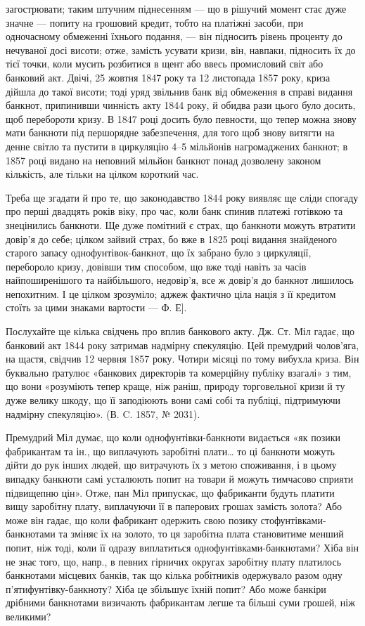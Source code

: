 \parcont{}  %
загострювати; таким штучним піднесенням — що в рішучий момент стає дуже
значне — попиту на грошовий кредит, тобто на платіжні засоби, при одночасному
обмеженні їхнього подання, — він підносить рівень проценту до нечуваної досі
висоти; отже, замість усувати кризи, він, навпаки, підносить їх до тієї точки,
коли мусить розбитися в щент або ввесь промисловий світ або банковий акт.
Двічі, 25 жовтня 1847 року та 12 листопада 1857 року, криза дійшла до такої
висоти; тоді уряд звільнив банк від обмеження в справі видання банкнот, припинивши
чинність акту 1844 року, й обидва рази цього було досить, щоб перебороти
кризу. В 1847 році досить було певности, що тепер можна знову мати
банкноти під першорядне забезпечення, для того щоб знову витягти на денне
світло та пустити в циркуляцію 4--5 мільйонів нагромаджених банкнот; в
1857 році видано на неповний мільйон банкнот понад дозволену законом кількість,
але тільки на цілком короткий час.

Треба ще згадати й про те, що законодавство 1844 року виявляє ще сліди
спогаду про перші двадцять років віку, про час, коли банк спинив платежі готівкою
та знецінились банкноти. Ще дуже помітний є страх, що банкноти можуть
втратити довір’я до себе; цілком зайвий страх, бо вже в 1825 році видання
знайденого старого запасу однофунтівок-банкнот, що їх забрано було з
циркуляції, перебороло кризу, довівши тим способом, що вже тоді навіть за часів
найпоширенішого та найбільшого, недовір’я, все ж довір’я до банкнот лишилось
непохитним. І це цілком зрозуміло; аджеж фактично ціла нація з її кредитом
стоїть за цими знаками вартости — Ф. Е].

Послухайте ще кілька свідчень про вплив банкового акту. Дж. Ст. Міл
гадає, що банковий акт 1844 року затримав надмірну спекуляцію. Цей премудрий
чолов’яга, на щастя, свідчив 12 червня 1857 року. Чотири місяці по тому
вибухла криза. Він буквально ґратулює «банкових директорів та комерційну
публіку взагалі» з тим, що вони «розуміють тепер краще, ніж раніш, природу
торговельної кризи й ту дуже велику шкоду, що її заподіюють вони самі собі
та публіці, підтримуючи надмірну спекуляцію». (В. C. 1857, № 2031).

Премудрий Міл думає, що коли однофунтівки-банкноти видається «як позики
фабрикантам та ін., що виплачують заробітні плати\dots{} то ці банкноти
можуть дійти до рук інших людей, що витрачують їх з метою споживання, і в
цьому випадку банкноти самі усталюють попит на товари й можуть тимчасово
сприяти підвищепню цін». Отже, пан Міл припускає, що фабриканти будуть
платити вищу заробітну плату, виплачуючи її в паперових грошах замість золота?
Або може він гадає, що коли фабрикант одержить свою позику стофунтівками-банкнотами
та зміняє їх на золото, то ця заробітна плата становитиме менший
попит, ніж тоді, коли її одразу виплатиться однофунтівками-банкнотами? Хіба
він не знає того, що, напр., в певних гірничих округах заробітну плату платилось
банкнотами місцевих банків, так що кілька робітників одержувало разом
одну п’ятифунтівку-банкноту? Хіба це збільшує їхній попит? Або може банкіри
дрібними банкнотами визичають фабрикантам легше та більші суми грошей,
ніж великими?

